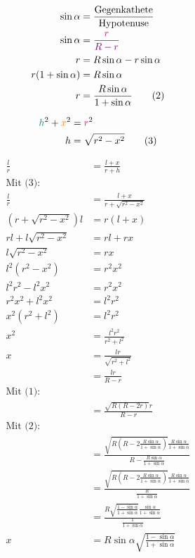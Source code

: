 \documentclass[12pt,a4paper,oneside]{article}
\begin{document}
\begin{align*}
	\sin\alpha &= \frac{\text{Gegenkathete}}{\text{Hypotenuse}} \\
	\sin\alpha &= \frac{ \textcolor{magenta}{r} }{ \textcolor{violet}{R-r} } \\
	r &= R\sin\alpha - r\sin\alpha \\
	r(1+\sin\alpha) &= R\sin\alpha \\
	r &= \frac{R\sin\alpha}{1+\sin\alpha} \tag{2}
\end{align*}

\begin{align*}
	\textcolor{teal}{h}^2 + \textcolor{orange}{x}^2 &= \textcolor{magenta}{r}^2 \\
	h &= \sqrt{r^2-x^2} \tag{3}
\end{align*}

\begin{samepage}
	\begin{align*}
		\frac{l}{r} &= \frac{l+x}{r+h} \\
		\text{Mit (3):} \\
		\frac{l}{r} &= \frac{l+x}{r+\sqrt{r^2-x^2}} \\
		(r+\sqrt{r^2-x^2})l &= r(l+x) \\
		rl + l\sqrt{r^2-x^2} &= rl+rx \\
		l\sqrt{r^2-x^2} &= rx \\
		l^2(r^2-x^2) &= r^2 x^2 \\
		l^2 r^2 - l^2 x^2 &= r^2 x^2 \\
		r^2 x^2 + l^2 x^2 &= l^2 r^2 \\
		x^2 (r^2+l^2) &= l^2 r^2 \\
		x^2 &= \frac{l^2 r^2}{r^2 + l^2} \\
		x &= \frac{lr}{\sqrt{r^2+l^2}} \\
		&= \frac{lr}{R-r} \\
		\text{Mit (1):} \\
		&= \frac{\sqrt{R(R-2r)}r}{R-r} \\
		\text{Mit (2):} \\
		&= \frac{\sqrt{R(R-2\frac{R\sin\alpha}{1+\sin\alpha})}\frac{R\sin\alpha}{1+\sin\alpha}}{R-\frac{R\sin\alpha}{1+\sin\alpha}} \\
		&= \frac{\sqrt{R(R-2\frac{R\sin\alpha}{1+\sin\alpha})}\frac{R\sin\alpha}{1+\sin\alpha}}{\frac{R}{1+\sin\alpha}} \\
		&= \frac{R\sqrt{\frac{1-\sin\alpha}{1+\sin\alpha}}\frac{\sin\alpha}{1+\sin\alpha}}{\frac{1}{1+\sin\alpha}} \\
		x &= R\sin\alpha\sqrt{\frac{1-\sin\alpha}{1+\sin\alpha}} \tag{4}
	\end{align*}
\end{samepage}
\end{document}
